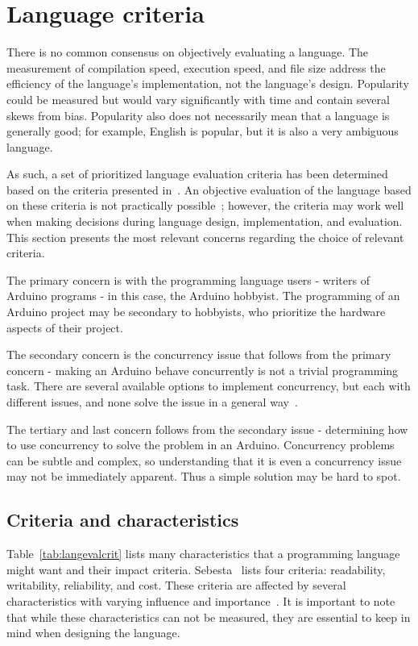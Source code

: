 \section{Language criteria}\label{sec:languageeval}
There is no common consensus on objectively evaluating a language. The measurement of compilation speed, execution speed, and file size address the efficiency of the language's implementation, not the language's design. Popularity could be measured but would vary significantly with time and contain several skews from bias. Popularity also does not necessarily mean that a language is generally good; for example, English is popular, but it is also a very ambiguous language.

As such, a set of prioritized language evaluation criteria has been determined based on the criteria presented in~\cite{Sebesta2016}. An objective evaluation of the language based on these criteria is not practically possible~\cite{Sebesta2016}; however, the criteria may work well when making decisions during language design, implementation, and evaluation. This section presents the most relevant concerns regarding the choice of relevant criteria.

The primary concern is with the programming language users - writers of Arduino programs - in this case, the Arduino hobbyist. The programming of an Arduino project may be secondary to hobbyists, who prioritize the hardware aspects of their project.

The secondary concern is the concurrency issue that follows from the primary concern - making an Arduino behave concurrently is not a trivial programming task. There are several available options to implement concurrency, but each with different issues, and none solve the issue in a general way~\cite{Restucia2022}.

The tertiary and last concern follows from the secondary issue - determining how to use concurrency to solve the problem in an Arduino. Concurrency problems can be subtle and complex, so understanding that it is even a  concurrency issue may not be immediately apparent. Thus a simple solution may be hard to spot.


\subsection{Criteria and characteristics}\label{subsec:priorityofcriteria}
Table~\ref{tab:langevalcrit} lists many characteristics that a programming language might want and their impact criteria. Sebesta~\cite{Sebesta2016} lists four criteria: readability, writability, reliability, and cost. These criteria are affected by several characteristics with varying influence and importance~\cite{Sebesta2016}. It is important to note that while these characteristics can not be measured, they are essential to keep in mind when designing the language.


